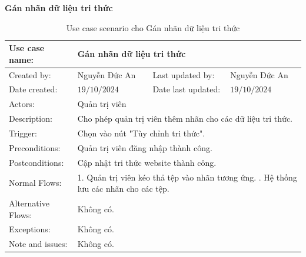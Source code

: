 \textbf{Gán nhãn dữ liệu tri thức}
\begin{table}[H]
	\centering
	\begin{tabular}{|l|l|l|l|} 
		\hline Use case name: & \multicolumn{3}{|l|}{Gán nhãn dữ liệu tri thức} \\ 
		\hline Created by: & Nguyễn Đức An & Last updated by: & Nguyễn Đức An \\ 
		\hline Date created: & $19 / 10 / 2024$ & Date last updated: & $19 / 10 / 2024$\\ 
		\hline Actors: & \multicolumn{3}{|l|}{ Quản trị viên } \\ 
		\hline Description: & \multicolumn{3}{|p{12cm}|}{ Cho phép quản trị viên thêm nhãn cho các dữ liệu tri thức. } \\ 
		\hline Trigger: & \multicolumn{3}{|p{12cm}|}{ Chọn vào nút "Tùy chỉnh tri thức". } \\ 
		\hline Preconditions: & \multicolumn{3}{|p{12cm}|}{ 
			Quản trị viên đăng nhập thành công. 
		} \\ 
		\hline Postconditions: & \multicolumn{3}{|p{12cm}|}{ 
			Cập nhật tri thức website thành công. 
		} \\ 
		\hline Normal Flows: & \multicolumn{3}{|p{12cm}|}{ 
			1. Quản trị viên kéo thả tệp vào nhãn tương ứng. \newline 
			2. Hệ thống lưu các nhãn cho các tệp. 
		} \\ 
		\hline Alternative Flows: & \multicolumn{3}{|p{12cm}|}{ Không có. } \\ 
		\hline Exceptions: & \multicolumn{3}{|p{12cm}|}{ Không có. } \\ 
		\hline Note and issues: & \multicolumn{3}{|p{12cm}|}{ Không có. } \\ 
		\hline
	\end{tabular}
	\caption{Use case scenario cho Gán nhãn dữ liệu tri thức}
\end{table}

